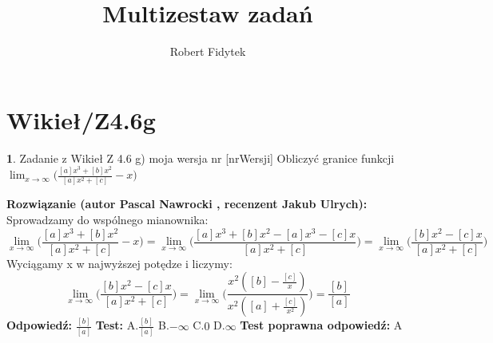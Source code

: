 \documentclass[12pt, a4paper]{article}
\title{Multizestaw zadań}
\author{Robert Fidytek}
\date{}
\theoremstyle{definition} %
\newtheorem{zad}{}
\newcommand{\kategoria}[1]{\section{#1}} %
\newcommand{\zadStart}[1]{\begin{zad}#1\newline} %
\newcommand{\zadStop}{\end{zad}}   %
\newcommand{\rozwStart}[2]{\noindent \textbf{Rozwiązanie (autor #1 , recenzent #2): }\newline} %
\newcommand{\rozwStop}{\newline}                                            %
\newcommand{\odpStart}{\noindent \textbf{Odpowiedź:}\newline}    %
\newcommand{\odpStop}{\newline}                                             %
\newcommand{\testStart}{\noindent \textbf{Test:}\newline} %
\newcommand{\testStop}{\newline} %
\newcommand{\kluczStart}{\noindent \textbf{Test poprawna odpowiedź:}\newline} %
\newcommand{\kluczStop}{\newline} %
\begin{document}
\maketitle


\kategoria{Wikieł/Z4.6g}
\zadStart{Zadanie z Wikieł Z 4.6 g) moja wersja nr [nrWersji]}
Obliczyć granice funkcji $\displaystyle{\lim_{x \to \infty}}\bigg(\frac{[a]x^3+[b]x^2}{[a]x^2+[c]}-x\bigg)$
\zadStop
\rozwStart{Pascal Nawrocki}{Jakub Ulrych}
Sprowadzamy do wspólnego mianownika:
$$\displaystyle{\lim_{x \to \infty}}\bigg(\frac{[a]x^3+[b]x^2}{[a]x^2+[c]}-x\bigg)=\displaystyle{\lim_{x \to \infty}}\bigg(\frac{[a]x^3+[b]x^2-[a]x^3-[c]x}{[a]x^2+[c]}\bigg)=\displaystyle{\lim_{x \to \infty}}\bigg(\frac{[b]x^2-[c]x}{[a]x^2+[c]}\bigg)$$
Wyciągamy x w najwyższej potędze i liczymy:
$$\displaystyle{\lim_{x \to \infty}}\bigg(\frac{[b]x^2-[c]x}{[a]x^2+[c]}\bigg)=\displaystyle{\lim_{x \to \infty}}\bigg(\frac{x^2([b]-\frac{[c]}{x})}{x^2([a]+\frac{[c]}{x^2})}\bigg)=\frac{[b]}{[a]}$$
\rozwStop
\odpStart
$\frac{[b]}{[a]}$
\odpStop
\testStart
A.$\frac{[b]}{[a]}$
B.$-\infty$
C.$0$
D.$\infty$
\testStop
\kluczStart
A
\kluczStop
\end{document}
